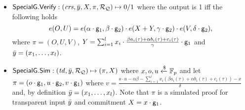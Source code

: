 \begin{definition}
\begin{itemize}
\item ${\mathsf{SpecialG}}.{\mathsf{Verify}}: (\mathit{crs}, \bar{y}, X, \pi, \mathcal{R}_{\mathcal{Q}}) \mapsto 0/1$ where the output is 1 iff the following holds 
$$e(O,U) = e(\alpha \cdot \mathsf{g}_1, \beta \cdot \mathsf{g}_2) \cdot e(X + Y, \gamma \cdot \mathsf{g}_2) \cdot e(V, \delta \cdot \mathsf{g}_2),$$
where $\pi = (O, U, V)$, $Y = \sum_{i=1}^{l} x_i \cdot \frac{\beta a_i(\tau)+ \alpha b_i(\tau)+ c_i(\tau)}{\gamma}  \cdot \mathsf{g}_1$ 
and $\bar{y} = (x_1, \ldots, x_l)$.

\item ${\mathsf{SpecialG}}.{\mathsf{Sim}}: (\mathit{td}, \bar{y}, \mathcal{R}_{\mathcal{Q}}) \mapsto (\pi, X)$ where $x, o, u \xleftarrow {\$} \mathbb{F}_p$ and let \\
$\pi = (o \cdot \mathsf{g}_1, u  \cdot \mathsf{g}_2 , v \cdot \mathsf{g}_1)$ where 
$v = \frac{o\cdot u - \alpha \beta - \sum_{i=1}^{l} x_i (\beta a_i(\tau)+ \alpha b_i(\tau)+ c_i(\tau))- x}{\delta}  $ and, 
by definition $\bar{y} = (x_1, \ldots, x_l)$. Note that $\pi$ is a simulated proof for transparent input $\bar{y}$ 
and commitment $X = x \cdot \mathsf{g}_1$.
\end{itemize} 
\end{definition}

\begin{comment}
\noindent \paragraph{Notes:} First, the trusted setup required by \SpecialG is 
an extension of that required by original Groth16~\cite{Groth16} by two additional 
group elements $\Kgamma = [\frac{\eta}{\gamma}]_1$ and $\Kdelta = [\frac{\eta}{\delta}]_1$. 
An identical trusted setup to that used by \SpecialG was also used in LegoSNARK~\cite[Fig.~22]{LegoSNARK} which defines 
a commit-carrying SNARK based on Groth16. Second, our $\SpecialG.\Reprove$ algorithm uses a Groth16 re-randomisation 
technique for the proof (see~\cite[Fig.~1]{RandomizationGroth16} or LegoSNARK~\cite[Fig.~22]{LegoSNARK}), 
but, in addition, $\SpecialG.\Reprove$ also re-randomises $X$ which is a commitment to a slice of the public input; moreover, in terms of security 
properties, we appropriately define the zero-knowledge for zk continuations such that even after iteratively applying 
$\SpecialG.\Reprove$ zero-knowledge property is preserved for both the witness as well as the public input committed to in $X$.  \\
\end{comment}

